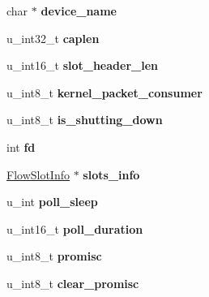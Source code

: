 \begin{DoxyCompactItemize}
\item 
\hypertarget{struct____pfring_ae2780ec5a55f92c88b7c651898a15c9a}{
char $\ast$ {\bfseries device\_\-name}}
\label{struct____pfring_ae2780ec5a55f92c88b7c651898a15c9a}

\item 
\hypertarget{struct____pfring_ab97e824cf9550b25e96e6751af9ae508}{
u\_\-int32\_\-t {\bfseries caplen}}
\label{struct____pfring_ab97e824cf9550b25e96e6751af9ae508}

\item 
\hypertarget{struct____pfring_a08dbad4d4e3ab12522c3a917a5964d63}{
u\_\-int16\_\-t {\bfseries slot\_\-header\_\-len}}
\label{struct____pfring_a08dbad4d4e3ab12522c3a917a5964d63}

\item 
\hypertarget{struct____pfring_a62babb3717e3a4c06ce99b7cc31f2a73}{
u\_\-int8\_\-t {\bfseries kernel\_\-packet\_\-consumer}}
\label{struct____pfring_a62babb3717e3a4c06ce99b7cc31f2a73}

\item 
\hypertarget{struct____pfring_ad62acbaacaaeb0353680ccea58121027}{
u\_\-int8\_\-t {\bfseries is\_\-shutting\_\-down}}
\label{struct____pfring_ad62acbaacaaeb0353680ccea58121027}

\item 
\hypertarget{struct____pfring_aa88bc469dc2e6cb909af86e511cd96fb}{
int {\bfseries fd}}
\label{struct____pfring_aa88bc469dc2e6cb909af86e511cd96fb}

\item 
\hypertarget{struct____pfring_ad53c22fb55cd16ad8718656d240d0d1e}{
\hyperlink{structflow_slot_info}{FlowSlotInfo} $\ast$ {\bfseries slots\_\-info}}
\label{struct____pfring_ad53c22fb55cd16ad8718656d240d0d1e}

\item 
\hypertarget{struct____pfring_ac7b48b8d75477dc138e7db3a6cdf6e91}{
u\_\-int {\bfseries poll\_\-sleep}}
\label{struct____pfring_ac7b48b8d75477dc138e7db3a6cdf6e91}

\item 
\hypertarget{struct____pfring_ab781160cce2393311611a57c3baa91a4}{
u\_\-int16\_\-t {\bfseries poll\_\-duration}}
\label{struct____pfring_ab781160cce2393311611a57c3baa91a4}

\item 
\hypertarget{struct____pfring_aca9f091e60b1d5b2fdf80e1db8dd7586}{
u\_\-int8\_\-t {\bfseries promisc}}
\label{struct____pfring_aca9f091e60b1d5b2fdf80e1db8dd7586}

\item 
\hypertarget{struct____pfring_af2f445bae6e4457ae4162274036729d2}{
u\_\-int8\_\-t {\bfseries clear\_\-promisc}}
\label{struct____pfring_af2f445bae6e4457ae4162274036729d2}


\end{DoxyCompactItemize}
